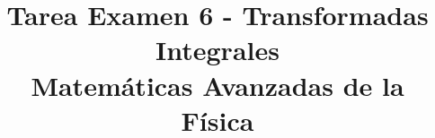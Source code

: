 
\usepackage{standalone}
\usepackage{tikz}   
\usepackage{tikz-3dplot}
\usetikzlibrary{decorations.pathmorphing,patterns}
\usepackage{enumerate}
\usepackage{pifont}
\renewcommand{\labelitemi}{\ding{43}}
\title{{Tarea Examen 6 - Transformadas Integrales} \\ {\large Matemáticas Avanzadas de la Física}\vspace{-1.5\baselineskip}}
\date{ }

\vspace{-4cm}
\renewcommand\labelenumii{\theenumi.{\arabic{enumii}})}
\maketitle
\fontsize{14}{14}\selectfont
